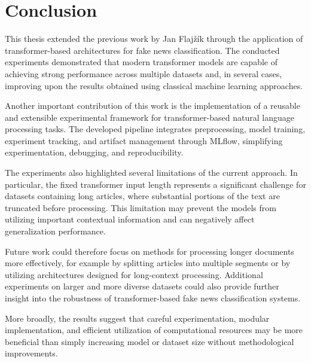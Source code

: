 \chapter{Conclusion}

\begin{markdown}

This thesis extended the previous work by Jan Flajžík \cite{flajzik_classification_2024} through the application of transformer-based architectures for fake news classification. The conducted experiments demonstrated that modern transformer models are capable of achieving strong performance across multiple datasets and, in several cases, improving upon the results obtained using classical machine learning approaches.

Another important contribution of this work is the implementation of a reusable and extensible experimental framework for transformer-based natural language processing tasks. The developed pipeline integrates preprocessing, model training, experiment tracking, and artifact management through MLflow, simplifying experimentation, debugging, and reproducibility.

The experiments also highlighted several limitations of the current approach. In particular, the fixed transformer input length represents a significant challenge for datasets containing long articles, where substantial portions of the text are truncated before processing. This limitation may prevent the models from utilizing important contextual information and can negatively affect generalization performance.

Future work could therefore focus on methods for processing longer documents more effectively, for example by splitting articles into multiple segments or by utilizing architectures designed for long-context processing. Additional experiments on larger and more diverse datasets could also provide further insight into the robustness of transformer-based fake news classification systems.

More broadly, the results suggest that careful experimentation, modular implementation, and efficient utilization of computational resources may be more beneficial than simply increasing model or dataset size without methodological improvements.

\end{markdown}